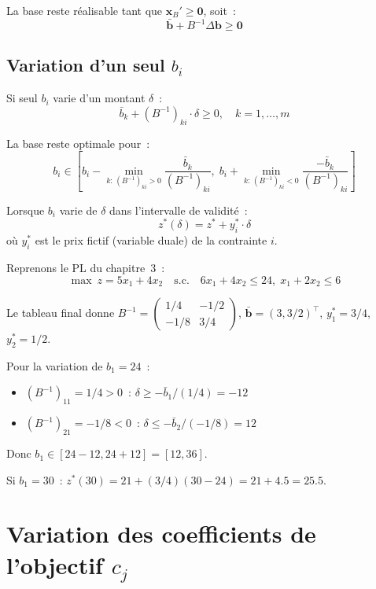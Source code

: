 La base reste r\'ealisable tant que $\mathbf{x}_B' \ge \mathbf{0}$, soit~:
\[
  \bar{\mathbf{b}} + B^{-1}\Delta\mathbf{b} \ge \mathbf{0}
\]

\subsection{Variation d'un seul $b_i$}

Si seul $b_i$ varie d'un montant $\delta$~:
\[
  \bar{b}_k + (B^{-1})_{ki} \cdot \delta \ge 0, \quad k = 1, \ldots, m
\]

\begin{formules}[title=\textbf{Intervalle de validit\'e de $b_i$}]
La base reste optimale pour~:
\[
  b_i \in \left[
    b_i - \min_{k:\, (B^{-1})_{ki}>0} \frac{\bar{b}_k}{(B^{-1})_{ki}},\;
    b_i + \min_{k:\, (B^{-1})_{ki}<0} \frac{-\bar{b}_k}{(B^{-1})_{ki}}
  \right]
\]
\end{formules}

\begin{theoreme}[Variation de $z^*$]
Lorsque $b_i$ varie de $\delta$ dans l'intervalle de validit\'e~:
\[
  z^*(\delta) = z^* + y_i^* \cdot \delta
\]
o\`u $y_i^*$ est le prix fictif (variable duale) de la contrainte $i$.
\end{theoreme}

\begin{exemple}[Variation de $b_1$]
Reprenons le PL du chapitre~3~:
\[
\max\ z = 5x_1 + 4x_2 \quad \text{s.c.} \quad
6x_1 + 4x_2 \le 24,\; x_1 + 2x_2 \le 6
\]

Le tableau final donne $B^{-1} = \begin{pmatrix} 1/4 & -1/2 \\
-1/8 & 3/4 \end{pmatrix}$, $\bar{\mathbf{b}} = (3, 3/2)^\top$,
$y_1^* = 3/4$, $y_2^* = 1/2$.

Pour la variation de $b_1 = 24$~:
\begin{itemize}
  \item $(B^{-1})_{11} = 1/4 > 0$~: $\delta \ge -\bar{b}_1/(1/4) = -12$
  \item $(B^{-1})_{21} = -1/8 < 0$~: $\delta \le -\bar{b}_2/(-1/8) = 12$
\end{itemize}
Donc $b_1 \in [24-12, 24+12] = [12, 36]$.

Si $b_1 = 30$~: $z^*(30) = 21 + (3/4)(30-24) = 21 + 4.5 = 25.5$.
\end{exemple}

\section{Variation des coefficients de l'objectif $c_j$}

